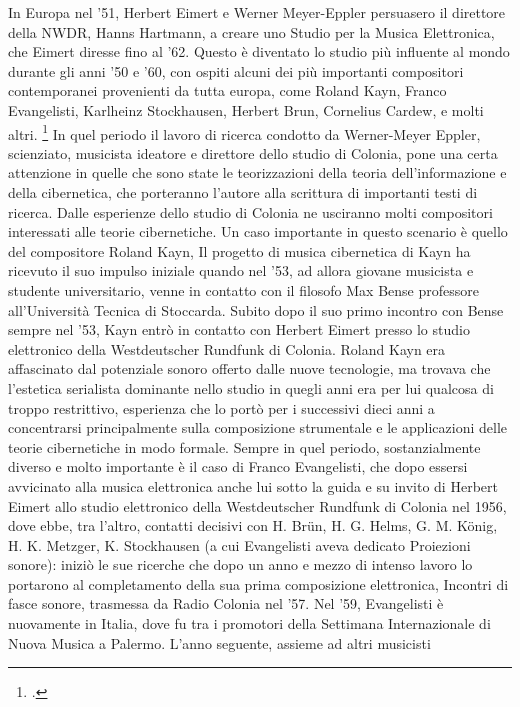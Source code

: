 In Europa nel '51, Herbert Eimert e Werner Meyer-Eppler
persuasero il direttore della NWDR,
Hanns Hartmann,
a creare uno Studio per la Musica Elettronica, che Eimert diresse fino al '62.
Questo è diventato lo studio più influente al mondo durante gli anni '50 e '60,
con ospiti alcuni dei più importanti compositori contemporanei provenienti da tutta europa,
come Roland Kayn, Franco Evangelisti, Karlheinz Stockhausen, Herbert Brun,
Cornelius Cardew, e molti altri. \footcite{EMSColonia}
In quel periodo il lavoro di ricerca condotto da Werner-Meyer Eppler,
scienziato, musicista ideatore e direttore dello studio di Colonia,
pone una certa attenzione in quelle che sono state
le teorizzazioni della teoria dell'informazione e della cibernetica,
che porteranno l'autore alla scrittura di importanti testi di ricerca.
Dalle esperienze dello studio di Colonia ne usciranno molti compositori interessati
alle teorie cibernetiche.
Un caso importante in questo scenario è quello del compositore Roland Kayn,
Il progetto di musica cibernetica di Kayn ha ricevuto il suo impulso iniziale
quando nel '53, ad allora giovane musicista e studente universitario,
venne in contatto con il filosofo Max Bense professore all'Università Tecnica di Stoccarda.
Subito dopo il suo primo incontro con Bense sempre nel '53, Kayn entrò in contatto con Herbert
Eimert presso lo studio elettronico della Westdeutscher Rundfunk di Colonia.
Roland Kayn era affascinato dal potenziale sonoro offerto dalle nuove tecnologie,
ma trovava che l'estetica serialista dominante nello studio in quegli anni
era per lui qualcosa di troppo restrittivo, esperienza che lo portò
per i successivi dieci anni a concentrarsi
principalmente sulla composizione strumentale e le applicazioni delle teorie
cibernetiche in modo formale.
Sempre in quel periodo, sostanzialmente diverso e molto importante
è il caso di Franco Evangelisti, che dopo essersi avvicinato alla musica elettronica
anche lui sotto la guida e su invito di Herbert Eimert allo studio elettronico della Westdeutscher Rundfunk di Colonia nel 1956, dove ebbe, tra l’altro, contatti decisivi con H. Brün, H. G. Helms, G. M. König, H. K. Metzger, K. Stockhausen (a cui Evangelisti aveva dedicato Proiezioni sonore): iniziò le sue ricerche che dopo un anno e mezzo di intenso lavoro lo portarono al completamento della sua prima composizione elettronica, Incontri di fasce sonore, trasmessa da Radio Colonia nel '57.
Nel '59, Evangelisti è nuovamente in Italia, dove fu tra i promotori
della Settimana Internazionale di Nuova Musica a Palermo.
L'anno seguente, assieme ad altri musicisti
